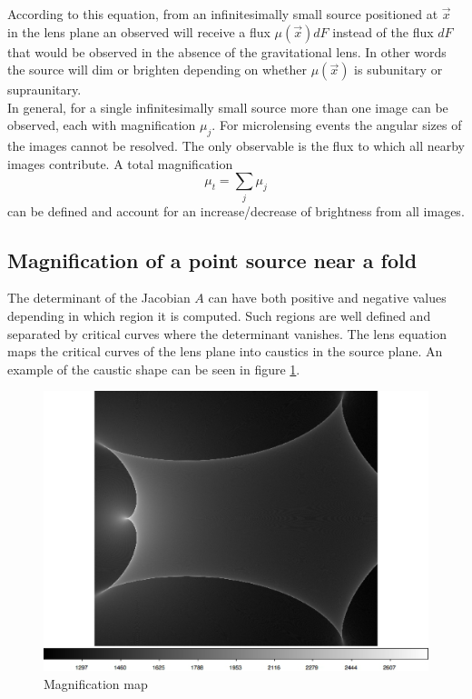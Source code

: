 According to this equation, from an infinitesimally small source positioned at $\vec{x}$ in the lens plane an observed will receive a flux $\mu(\vec{x}) dF$ instead of the flux $dF$ that would be
observed in the absence of the gravitational lens. In other words the source will dim or brighten depending on whether $\mu(\vec{x})$ is subunitary or supraunitary.\\

In general, for a single infinitesimally small source more than one image can be observed, each with magnification $\mu_j$. For microlensing events the angular sizes of the
images cannot be resolved. The only observable is the flux to which all nearby images contribute. A total magnification
\begin{equation}
 \mu_t = \sum_{j} \mu_j
\end{equation}
 can be defined and account for an increase/decrease of brightness from all images.


\subsection{Magnification of a point source near a fold}

The determinant of the Jacobian $A$ can have both positive and negative values depending in which region it is computed. Such regions are well defined and separated
by critical curves where the determinant vanishes. The lens equation maps the critical curves of the lens plane into caustics in the source plane. An example of the caustic 
shape can be seen in figure \ref{fig:magnification}.\\

\begin{figure}
\centering
  \includegraphics[width=0.95\hsize]{plots/magnification.eps}
\caption{\label{fig:magnification} Magnification map}
\end{figure}

